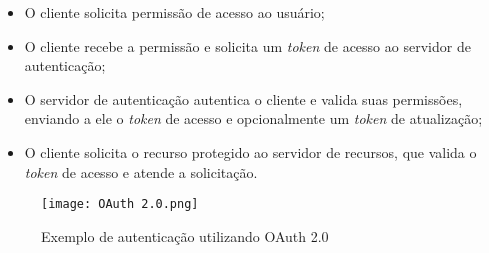 \begin{itemize}
\item O cliente solicita permissão de acesso ao usuário;
\item O cliente recebe a permissão e solicita um \emph{token} de acesso ao servidor de autenticação;
\item O servidor de autenticação autentica o cliente e valida suas permissões, enviando a ele o 
\emph{token} de acesso e opcionalmente um \emph{token} de atualização;
\item O cliente solicita o recurso protegido ao servidor de recursos, que valida o \emph{token} de 
acesso e atende a solicitação.
\end{itemize}

\begin{figure}[ht]
    \centering
    \texttt{[image: OAuth 2.0.png]}
    \caption{Exemplo de autenticação utilizando OAuth 2.0}
    \label{fig:OAuth2}
\end{figure}